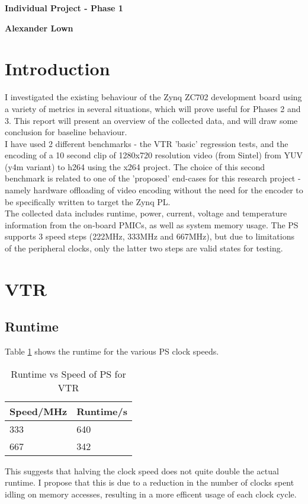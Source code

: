 \documentclass[a4paper]{article}
\begin{document}
\centerline{\Large \bf Individual Project - Phase 1}
\medskip
\centerline{\bf Alexander Lown}
\bigskip

\section{Introduction}
  I investigated the existing behaviour of the Zynq ZC702 development board using a variety of metrics in several situations, which will prove useful for Phases 2 and 3.
  This report will present an overview of the collected data, and will draw some conclusion for baseline behaviour.\\
  I have used 2 different benchmarks - the VTR 'basic' regression tests, and the encoding of a 10 second clip of 1280x720 resolution video (from Sintel) from YUV (y4m variant) to h264 using the x264 project.
  The choice of this second benchmark is related to one of the 'proposed' end-cases for this research project - namely hardware offloading of video encoding without the need for the encoder to be specifically written to target the Zynq PL.\\
  The collected data includes runtime, power, current, voltage and temperature information from the on-board PMICs, as well as system memory usage. The PS supports 3 speed steps (222MHz, 333MHz and 667MHz), but due to limitations of the peripheral clocks, only the latter two steps are valid states for testing.

\section{VTR}
  \subsection{Runtime}
    Table \ref{tab:vtr:rt} shows the runtime for the various PS clock speeds.
    \begin{table}[bp]
      \centering
      \begin{tabular}{l | l}
        Speed/MHz & Runtime/s \\
        \hline
        333 & 640 \\
        667 & 342 \\
      \end{tabular}
      \caption{Runtime vs Speed of PS for VTR}
      \label{tab:vtr:rt}
    \end{table}
    This suggests that halving the clock speed does not quite double the actual runtime. I propose that this is due to a reduction in the number of clocks spent idling on memory accesses, resulting in a more efficent usage of each clock cycle.
\end{document}
